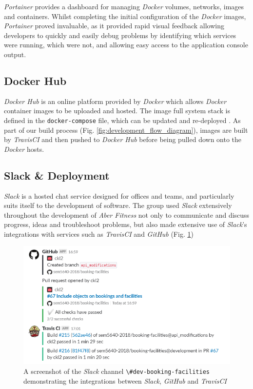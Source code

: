 \textit{Portainer} provides a dashboard for managing \textit{Docker} volumes, networks, images and containers. Whilst completing the initial configuration of the \textit{Docker} images, \textit{Portainer} proved invaluable, as it provided rapid visual feedback allowing developers to quickly and easily debug problems by identifying which services were running, which were not, and allowing easy access to the application console output.

\subsection{Docker Hub}
\textit{Docker Hub} is an online platform provided by \textit{Docker} which allows \textit{Docker} container images to be uploaded and hosted. The image full system stack is defined in the \lstinline{docker-compose} file, which can be updated and re-deployed . As part of our build process (Fig. \ref{fig:development_flow_diagram}), images are built by \textit{TravisCI} and then pushed to \textit{Docker Hub} before being pulled down onto the \textit{Docker} hosts.

\subsection{Slack \& Deployment}
\textit{Slack} is a hosted chat service designed for offices and teams, and particularly suits itself to the development of software. The group used \textit{Slack} extensively throughout the development of \textit{Aber Fitness} not only to communicate and discuss progress, ideas and troubleshoot problems, but also made extensive use of \textit{Slack}'s integrations with services such as \textit{TravisCI} and \textit{GitHub} (Fig. \ref{fig:slack_travis_github})

\begin{figure}[H]
    \centering
    \includegraphics[width=\textwidth]{Images/Slack_Travis_GitHub.png}
    \caption{A screenshot of the \textit{Slack} channel \lstinline{\#dev-booking-facilities} demonstrating the integrations between \textit{Slack}, \textit{GitHub} and \textit{TravisCI}}
    \label{fig:slack_travis_github}
\end{figure}

